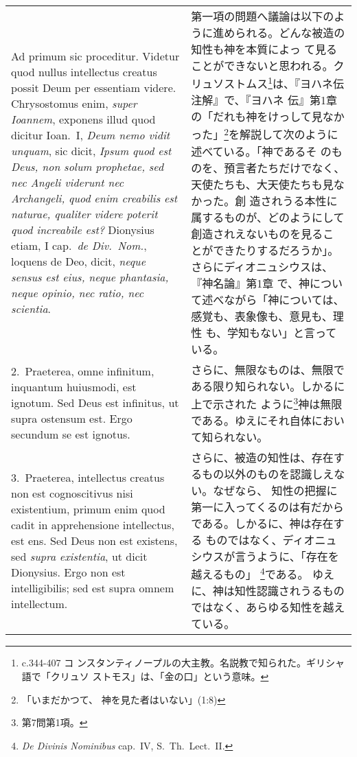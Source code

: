 \documentclass[10pt]{jsarticle} %
\begin{document}
\begin{longtable}{p{21em}p{21em}}

{\huge A}{\sc d primum sic proceditur}. Videtur quod nullus
intellectus creatus possit Deum per essentiam videre. Chrysostomus
enim, {\it super Ioannem}, exponens illud quod dicitur Ioan.\ I, {\it
Deum nemo vidit unquam}, sic dicit, {\it Ipsum quod est Deus, non
solum prophetae, sed nec Angeli viderunt nec Archangeli, quod enim
creabilis est naturae, qualiter videre poterit quod increabile est?}
Dionysius etiam, I cap.\ {\it de Div.\ Nom.}, loquens de Deo, dicit,
{\it neque sensus est eius, neque phantasia, neque opinio, nec ratio,
nec scientia}.

&

第一項の問題へ議論は以下のように進められる。どんな被造の知性も神を本質によっ
て見ることができないと思われる。クリュソストムス\footnote{c.344-407 コ
ンスタンティノープルの大主教。名説教で知られた。ギリシャ語で「クリュソ
ストモス」は、「金の口」という意味。}は、『ヨハネ伝注解』で、『ヨハネ
伝』第1章の「だれも神をけっして見なかった」\footnote{「いまだかつて、
神を見た者はいない」(1:8)}を解説して次のように述べている。「神であるそ
のものを、預言者たちだけでなく、天使たちも、大天使たちも見なかった。創
造されうる本性に属するものが、どのようにして創造されえないものを見るこ
とができたりするだろうか」。さらにディオニュシウスは、『神名論』第1章
で、神について述べながら「神については、感覚も、表象像も、意見も、理性
も、学知もない」と言っている。

\\

2.~{\sc Praeterea}, omne infinitum, inquantum huiusmodi, est ignotum. Sed Deus
 est infinitus, ut supra ostensum est. Ergo secundum se est ignotus.

&

さらに、無限なものは、無限である限り知られない。しかるに上で示された
ように\footnote{第7問第1項。}神は無限である。ゆえにそれ自体において知られない。

\\

3.~{\sc Praeterea}, intellectus creatus non est cognoscitivus nisi
existentium, primum enim quod cadit in apprehensione intellectus, est
ens. Sed Deus non est existens, sed {\it supra existentia}, ut dicit
Dionysius. Ergo non est intelligibilis; sed est supra omnem
intellectum.

&

さらに、被造の知性は、存在するもの以外のものを認識しえない。なぜなら、
知性の把握に第一に入ってくるのは有だからである。しかるに、神は存在する
ものではなく、ディオニュシウスが言うように、「存在を越えるもの」
\footnote{{\it De Divinis Nominibus} cap.~IV, S.~Th.~Lect.~II.}である。
ゆえに、神は知性認識されうるものではなく、あらゆる知性を越えている。


\end{longtable}
\end{document}
